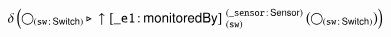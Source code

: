 \documentclass[varwidth=100cm,convert={density=120}]{standalone}
\begin{document}
\begin{preview}
$\duplicateelimination \left(\getvertices{sw}{Switch} \antijoin \expandout{\_e1}{monitoredBy}{sw}{\_sensor}{Sensor} \left(\getvertices{sw}{Switch}\right)\right)$
\end{preview}
\end{document}

